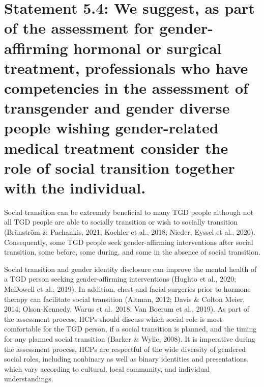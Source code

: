 \documentclass[
]{book}
\begin{document}
\hypertarget{statement-5.4-we-suggest-as-part-of-the-assessment-for-gender-affirming-hormonal-or-surgical-treatment-professionals-who-have-competencies-in-the-assessment-of-transgender-and-gender-diverse-people-wishing-gender-related-medical-treatment-consider-the-role-of-social-transition-together-with-the-individual.}{%
\section*{Statement 5.4: We suggest, as part of the assessment for gender-affirming hormonal or surgical treatment, professionals who have competencies in the assessment of transgender and gender diverse people wishing gender-related medical treatment consider the role of social transition together with the individual.}\label{statement-5.4-we-suggest-as-part-of-the-assessment-for-gender-affirming-hormonal-or-surgical-treatment-professionals-who-have-competencies-in-the-assessment-of-transgender-and-gender-diverse-people-wishing-gender-related-medical-treatment-consider-the-role-of-social-transition-together-with-the-individual.}}

Social transition can be extremely beneficial
to many TGD people although not all TGD people are able to socially transition or wish to
socially transition (Bränström \& Pachankis, 2021;
Koehler et al., 2018; Nieder, Eyssel et al., 2020).
Consequently, some TGD people seek
gender-affirming interventions after social transition, some before, some during, and some in
the absence of social transition.

Social transition and gender identity disclosure can improve the mental health of a TGD
person seeking gender-affirming interventions
(Hughto et al., 2020; McDowell et al., 2019). In
addition, chest and facial surgeries prior to hormone therapy can facilitate social transition
(Altman, 2012; Davis \& Colton Meier, 2014;
Olson-Kennedy, Warus et al.~2018; Van Boerum
et al., 2019). As part of the assessment process,
HCPs should discuss which social role is most
comfortable for the TGD person, if a social transition is planned, and the timing for any planned
social transition (Barker \& Wylie, 2008). It is
imperative during the assessment process, HCPs
are respectful of the wide diversity of gendered
social roles, including nonbinary as well as
binary identities and presentations, which vary
according to cultural, local community, and individual understandings.
\end{document}
